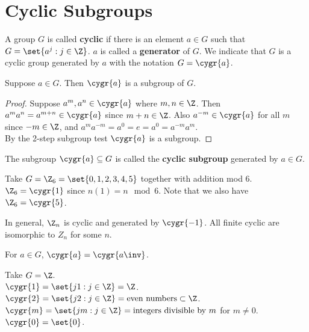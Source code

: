 \chapter{Cyclic Subgroups}


\begin{definition}
    A group $G$ is called \textbf{cyclic} if there is an element $a \in G$ such that $G = \set{a^j: j \in \Z}$. $a$ is called a \textbf{generator} of $G$. We indicate that $G$ is a cyclic group generated by $a$ with the notation $G = \cygr{a}$.
\end{definition}

\begin{theorem}
    Suppose $a \in G$. Then $\cygr{a}$ is a subgroup of $G$.
\end{theorem}
\begin{proof}
    Suppose $a^m, a^n \in \cygr{a}$ where $m, n \in \Z$. Then $a^ma^n = a^{m + n} \in \cygr{a}$ since $m + n \in \Z$. Also $a^{-m} \in \cygr{a}$ for all $m$ since $-m \in \Z$, and $a^ma^{-m} = a^0 = e = a^0 = a^{-m}a^m$. \\
    By the 2-step subgroup test $\cygr{a}$ is a subgroup.
\end{proof}

\begin{definition}
    The subgroup $\cygr{a} \subseteq G$ is called the \textbf{cyclic subgroup} generated by $a \in G$.
\end{definition}

\begin{example}[generators]
    Take $G = \Z_6 = \set{0,1,2,3,4,5}$ together with addition mod 6. \\
    $\Z_6 = \cygr{1}$ since $n(1) = n \mod 6$. Note that we also have $\Z_6 = \cygr{5}$.
\end{example}

\begin{remark}
    In general, $\Z_n$ is cyclic and generated by $\cygr{-1}$. All finite cyclic are isomorphic to $Z_n$ for some $n$.
\end{remark}

\begin{remark}
    For $a \in G$, $\cygr{a} = \cygr{a\inv}$.
\end{remark}

\begin{example}
    Take $G = \Z$. \\ 
    $\cygr{1} = \set{j1: j \in \Z} = \Z$. \\
    $\cygr{2} = \set{j2: j \in \Z} = \text{even numbers} \subset \Z$. \\
    $\cygr{m} = \set{jm: j \in \Z} = \text{integers divisible by } m$ for $m \neq 0$. \\
    $\cygr{0} = \set{0}$.
\end{example}

